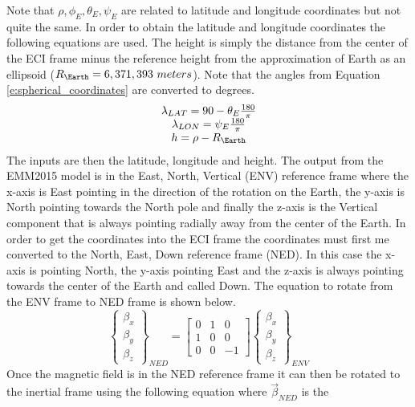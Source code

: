 \documentclass{article}
\begin{document}
Note that $\rho,\phi_E,\theta_E,\psi_E$ are related to latitude and
longitude coordinates but not quite the same. In order to obtain the
latitude and longitude coordinates the following equations are
used. The height is simply the distance from the center of the ECI
frame minus the reference height from the approximation of Earth as an
ellipsoid ($R_{\Earth}=6,371,393~meters$). Note that the angles from Equation
\ref{e:spherical_coordinates} are converted to degrees. 
\begin{equation}
  \begin{matrix}
    \lambda_{LAT} = 90 - \theta_E\frac{180}{\pi}\\
    \lambda_{LON} = \psi_E\frac{180}{\pi} \\
    h = \rho - R_{\Earth}
  \end{matrix}
\end{equation}
The inputs are then the latitude, longitude and height. The output
from the EMM2015 model is in the East, North, Vertical (ENV) reference frame
where the x-axis is East pointing in the direction of the rotation on
the Earth, the y-axis is North pointing towards the North pole and
finally the z-axis is the Vertical component that is always pointing
radially away from the center of the Earth. In order to get the
coordinates into the ECI frame the coordinates must first me converted
to the North, East, Down reference frame (NED). In this case the
x-axis is pointing North, the y-axis pointing East and the z-axis is
always pointing towards the center of the Earth and called Down. The
equation to rotate from the ENV frame to NED frame is shown below.
\begin{equation}
  \begin{Bmatrix} \beta_x \\ \beta_y \\ \beta_z \end{Bmatrix}_{NED}
  = \begin{bmatrix} 0 & 1 & 0 \\ 1 & 0 & 0 \\ 0 & 0 & -1 \end{bmatrix} \begin{Bmatrix} \beta_x \\ \beta_y \\ \beta_z \end{Bmatrix}_{ENV}
\end{equation}
Once the magnetic field is in the NED reference frame it can then be
rotated to the inertial frame using the following equation where $\vec{\beta}_{NED}$ is the
\end{document}
